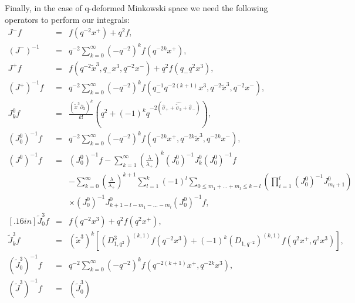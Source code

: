 \documentclass[a4paper,11pt,oneside]{article}
\begin{document}
Finally, in the case of q-deformed Minkowski space we need the following
operators to perform our integrals: 
\begin{eqnarray}
J^{-}f &=&f\left( q^{-2}x^{+}\right) +q^{2}f, \\
\left( J^{-}\right) ^{-1} &=&q^{-2}\sum_{k=0}^{\infty }\left( -q^{-2}\right)
^{k}f\left( q^{-2k}x^{+}\right) ,  \nonumber \\[0.16in]
J^{+}f &=&f\left( q^{-2}\tilde{x}^{3},q_{-}x^{3},q^{-2}x^{-}\right)
+q^{2}f\left( q_{-}q^{2}x^{3}\right) , \\
\left( J^{+}\right) ^{-1}f &=&q^{-2}\sum_{k=0}^{\infty }\left(
-q^{-2}\right) ^{k}f\left( q_{-}^{-1}q^{-2\left( k+1\right) }x^{3},q^{-2}%
\tilde{x}^{3},q^{-2}x^{-}\right) ,  \nonumber \\[0.16in]
J_{k}^{0}f &=&\frac{\left( \tilde{x}^{3}\partial _{3}\right) ^{k}}{k!}\left(
q^{2}+\left( -1\right) ^{k}q^{-2\left( \hat{\sigma}_{+}+\hat{\tilde{\sigma}%
_{3}}+\hat{\sigma}_{-}\right) }\right) , \\
\left( J_{0}^{0}\right) ^{-1}f &=&q^{-2}\sum_{k=0}^{\infty }\left(
-q^{-2}\right) ^{k}f\left( q^{-2k}x^{+},q^{-2k}\tilde{x}^{3},q^{-2k}x^{-}%
\right) ,  \nonumber \\
\left( J^{0}\right) ^{-1}f &=&\left( J_{0}^{0}\right)
^{-1}f-\sum_{k=1}^{\infty }\left( \frac{\lambda }{\lambda _{+}}\right)
^{k}\left( J_{0}^{0}\right) ^{-1}J_{k}^{0}\left( J_{0}^{0}\right) ^{-1}f 
\nonumber \\
&&-\sum_{k=0}^{\infty }\left( \frac{\lambda }{\lambda _{+}}\right)
^{k+1}\sum_{l=1}^{k}\left( -1\right) ^{l}\sum_{0\leq m_{1}+\ldots +m_{l}\leq
k-l}\left( \prod_{i=1}^{l}\left( J_{0}^{0}\right)
^{-1}J_{m_{i}+1}^{0}\right)   \nonumber \\
&&\times \left( J_{0}^{0}\right) ^{-1}J_{k+1-l-m_{1}-\ldots
-m_{l}}^{0}\left( J_{0}^{0}\right) ^{-1}f,  \nonumber \\
[.16in]\tilde{J}_{0}^{3}f &=&f\left( q^{-2}x^{3}\right) +q^{2}f\left(
q^{2}x^{+}\right) ,  \\
\tilde{J}_{k}^{3}f &=&\left( \tilde{x}^{3}\right) ^{k}\left[ \left(
D_{1,q^{2}}^{3}\right) ^{\left( k,1\right) }f\left( q^{-2}x^{3}\right)
+\left( -1\right) ^{k}\left( D_{1,q^{-2}}\right) ^{\left( k,1\right)
}f\left( q^{2}x^{+},q^{2}x^{3}\right) \right] ,  \nonumber \\
\left( \tilde{J}_{0}^{3}\right) ^{-1}f &=&q^{-2}\sum_{k=0}^{\infty }\left(
-q^{-2}\right) ^{k}f\left( q^{-2\left( k+1\right) }x^{+},q^{-2k}x^{3}\right)
,  \nonumber \\
\left( \tilde{J}^{3}\right) ^{-1}f &=&\left( \tilde{J}_{0}^{3}\right)

\end{eqnarray}
\end{document}
